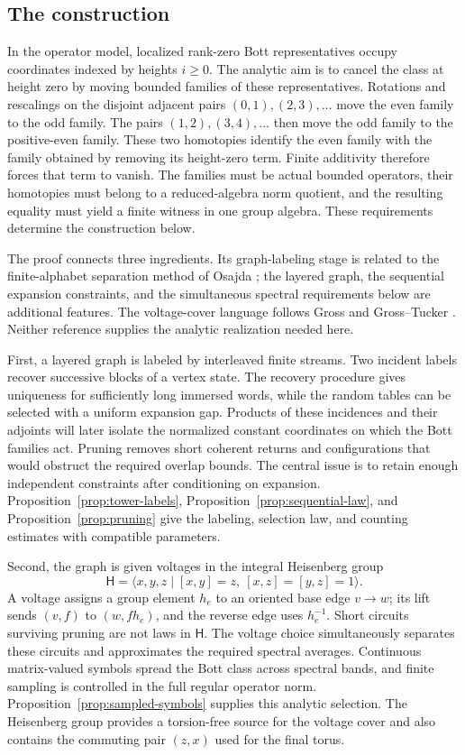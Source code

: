 \subsection{The construction}

In the operator model, localized rank-zero Bott representatives occupy
coordinates indexed by heights $i\geq0$. The analytic aim is to cancel
the class at height zero by moving bounded families of these
representatives. Rotations and
rescalings on the disjoint adjacent pairs $(0,1),(2,3),\ldots$ move
the even family to the odd family. The pairs $(1,2),(3,4),\ldots$
then move the odd family to the positive-even family. These two
homotopies identify the even family with the family obtained by removing
its height-zero term. Finite additivity therefore forces that term to
vanish. The families must be actual bounded operators, their homotopies
must belong to a reduced-algebra norm quotient, and the resulting
equality must yield a finite witness in one group algebra. These
requirements determine the construction below.

The proof connects three ingredients. Its graph-labeling stage is related
to the finite-alphabet separation method of Osajda \cite[\S2]{Osa20}; the
layered graph, the sequential expansion constraints, and the simultaneous
spectral requirements below are additional features. The voltage-cover
language follows Gross and Gross--Tucker \cite{Gross74,GT77}. Neither
reference supplies the analytic realization needed here.

First, a layered graph is labeled by interleaved finite streams.
Two incident labels recover successive blocks of a vertex state.
The recovery procedure gives uniqueness for sufficiently long immersed
words, while the random tables can be selected with a uniform expansion
gap. Products of these incidences and their adjoints will later isolate
the normalized constant coordinates on which the Bott families act.
Pruning removes short coherent returns and configurations that
would obstruct the required overlap bounds.  The central issue is to
retain enough independent constraints after conditioning on expansion.
Proposition~\ref{prop:tower-labels},
Proposition~\ref{prop:sequential-law}, and
Proposition~\ref{prop:pruning} give the labeling, selection law, and
counting estimates with compatible parameters.

Second, the graph is given voltages in the integral Heisenberg group
\[
  \mathsf H=\langle x,y,z\mid [x,y]=z,\ [x,z]=[y,z]=1\rangle.
\]
A voltage assigns a group element $h_e$ to an oriented base edge
$v\to w$; its lift sends $(v,f)$ to $(w,fh_e)$, and the reverse edge
uses $h_e^{-1}$.
Short circuits surviving pruning are not laws in $\mathsf H$.
The voltage choice simultaneously separates these circuits and
approximates the required spectral averages.  Continuous matrix-valued
symbols spread the Bott class across spectral bands, and finite
sampling is controlled in the full regular operator norm.
Proposition~\ref{prop:sampled-symbols} supplies this analytic selection.
The Heisenberg group provides a torsion-free source for the voltage
cover and also contains the commuting pair $(z,x)$ used for the final
torus.

